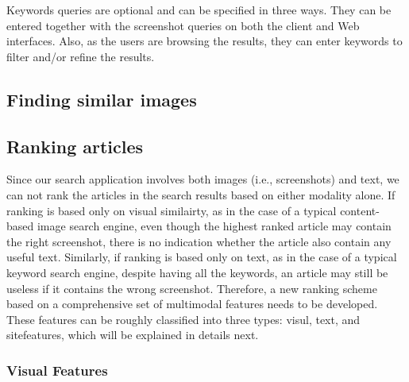 \documentclass{www2010-submission}
\begin{document}
Keywords queries are optional and can be specified in three ways.
They can be entered together with the screenshot queries on both
the client and Web interfaces. Also, as the users are browsing the
results, they can enter keywords to filter and/or refine the
results.

\subsection{Finding similar images}


\subsection{Ranking articles}

Since our search application involves both images (i.e., screenshots)
and text, we can not rank the articles in the search results based on
either modality alone. If ranking is based only on visual similairty,
as in the case of a typical content-based image search engine, even
though the highest ranked article may contain the right screenshot,
there is no indication whether the article also contain any useful
text. Similarly, if ranking is based only on text, as in the case of a
typical keyword search engine, despite having all the keywords, an
article may still be useless if it contains the wrong
screenshot. Therefore, a new ranking scheme based on a comprehensive
set of multimodal features needs to be developed. These features can
be roughly classified into three types: visul, text, and sitefeatures,
which will be explained in details next.

\subsubsection{Visual Features}
\end{document}
